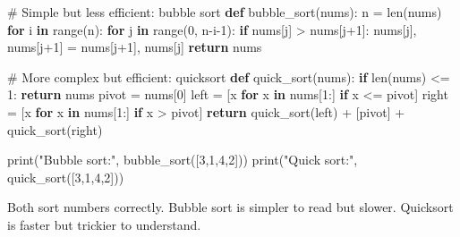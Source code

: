 \documentclass[
  letterpaper,
  DIV=11,
  numbers=noendperiod]{scrreprt}
\newenvironment{Shaded}{\begin{snugshade}}{\end{snugshade}}
\newcommand{\BuiltInTok}[1]{\textcolor[rgb]{0.00,0.23,0.31}{#1}}
\newcommand{\CommentTok}[1]{\textcolor[rgb]{0.37,0.37,0.37}{#1}}
\newcommand{\ControlFlowTok}[1]{\textcolor[rgb]{0.00,0.23,0.31}{\textbf{#1}}}
\newcommand{\DecValTok}[1]{\textcolor[rgb]{0.68,0.00,0.00}{#1}}
\newcommand{\KeywordTok}[1]{\textcolor[rgb]{0.00,0.23,0.31}{\textbf{#1}}}
\newcommand{\NormalTok}[1]{\textcolor[rgb]{0.00,0.23,0.31}{#1}}
\newcommand{\OperatorTok}[1]{\textcolor[rgb]{0.37,0.37,0.37}{#1}}
\newcommand{\StringTok}[1]{\textcolor[rgb]{0.13,0.47,0.30}{#1}}
\begin{document}
\begin{Shaded}
\begin{Highlighting}[]
\CommentTok{\# Simple but less efficient: bubble sort}
\KeywordTok{def}\NormalTok{ bubble\_sort(nums):}
\NormalTok{    n }\OperatorTok{=} \BuiltInTok{len}\NormalTok{(nums)}
    \ControlFlowTok{for}\NormalTok{ i }\KeywordTok{in} \BuiltInTok{range}\NormalTok{(n):}
        \ControlFlowTok{for}\NormalTok{ j }\KeywordTok{in} \BuiltInTok{range}\NormalTok{(}\DecValTok{0}\NormalTok{, n}\OperatorTok{{-}}\NormalTok{i}\OperatorTok{{-}}\DecValTok{1}\NormalTok{):}
            \ControlFlowTok{if}\NormalTok{ nums[j] }\OperatorTok{\textgreater{}}\NormalTok{ nums[j}\OperatorTok{+}\DecValTok{1}\NormalTok{]:}
\NormalTok{                nums[j], nums[j}\OperatorTok{+}\DecValTok{1}\NormalTok{] }\OperatorTok{=}\NormalTok{ nums[j}\OperatorTok{+}\DecValTok{1}\NormalTok{], nums[j]}
    \ControlFlowTok{return}\NormalTok{ nums}

\CommentTok{\# More complex but efficient: quicksort}
\KeywordTok{def}\NormalTok{ quick\_sort(nums):}
    \ControlFlowTok{if} \BuiltInTok{len}\NormalTok{(nums) }\OperatorTok{\textless{}=} \DecValTok{1}\NormalTok{:}
        \ControlFlowTok{return}\NormalTok{ nums}
\NormalTok{    pivot }\OperatorTok{=}\NormalTok{ nums[}\DecValTok{0}\NormalTok{]}
\NormalTok{    left }\OperatorTok{=}\NormalTok{ [x }\ControlFlowTok{for}\NormalTok{ x }\KeywordTok{in}\NormalTok{ nums[}\DecValTok{1}\NormalTok{:] }\ControlFlowTok{if}\NormalTok{ x }\OperatorTok{\textless{}=}\NormalTok{ pivot]}
\NormalTok{    right }\OperatorTok{=}\NormalTok{ [x }\ControlFlowTok{for}\NormalTok{ x }\KeywordTok{in}\NormalTok{ nums[}\DecValTok{1}\NormalTok{:] }\ControlFlowTok{if}\NormalTok{ x }\OperatorTok{\textgreater{}}\NormalTok{ pivot]}
    \ControlFlowTok{return}\NormalTok{ quick\_sort(left) }\OperatorTok{+}\NormalTok{ [pivot] }\OperatorTok{+}\NormalTok{ quick\_sort(right)}

\BuiltInTok{print}\NormalTok{(}\StringTok{"Bubble sort:"}\NormalTok{, bubble\_sort([}\DecValTok{3}\NormalTok{,}\DecValTok{1}\NormalTok{,}\DecValTok{4}\NormalTok{,}\DecValTok{2}\NormalTok{]))}
\BuiltInTok{print}\NormalTok{(}\StringTok{"Quick sort:"}\NormalTok{, quick\_sort([}\DecValTok{3}\NormalTok{,}\DecValTok{1}\NormalTok{,}\DecValTok{4}\NormalTok{,}\DecValTok{2}\NormalTok{]))}
\end{Highlighting}
\end{Shaded}

Both sort numbers correctly. Bubble sort is simpler to read but slower.
Quicksort is faster but trickier to understand.
\end{document}
